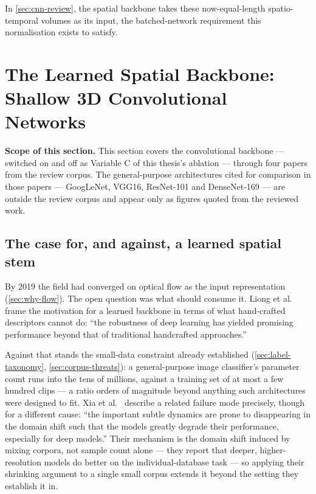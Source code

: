 In \autoref{sec:cnn-review}, the spatial backbone takes these now-equal-length spatio-temporal volumes as its input, the batched-network requirement this normalisation exists to satisfy.


\section{The Learned Spatial Backbone: Shallow 3D Convolutional Networks}
\label{sec:cnn-review}

\textbf{Scope of this section.} This section covers the convolutional backbone --- switched on and off as Variable C of this thesis's ablation --- through four papers from the review corpus. The general-purpose architectures cited for comparison in those papers --- GoogLeNet, VGG16, ResNet-101 and DenseNet-169 --- are outside the review corpus and appear only as figures quoted from the reviewed work.

\subsection{The case for, and against, a learned spatial stem}
\label{sec:cnn-case}

By 2019 the field had converged on optical flow as the input representation (\autoref{sec:why-flow}). The open question was what should consume it. Liong et al.~\cite{liong2019b} frame the motivation for a learned backbone in terms of what hand-crafted descriptors cannot do: ``the robustness of deep learning has yielded promising performance beyond that of traditional handcrafted approaches.''

Against that stands the small-data constraint already established (\autoref{sec:label-taxonomy}, \autoref{sec:corpus-threats}): a general-purpose image classifier's parameter count runs into the tens of millions, against a training set of at most a few hundred clips --- a ratio orders of magnitude beyond anything such architectures were designed to fit. Xia et al.~\cite{xia2020b} describe a related failure mode precisely, though for a different cause: ``the important subtle dynamics are prone to disappearing in the domain shift such that the models greatly degrade their performance, especially for deep models.'' Their mechanism is the domain shift induced by mixing corpora, not sample count alone --- they report that deeper, higher-resolution models do better on the individual-database task --- so applying their shrinking argument to a single small corpus extends it beyond the setting they establish it in.

